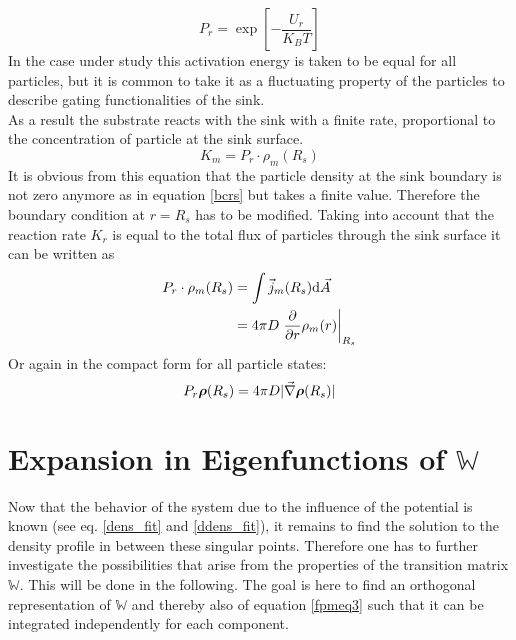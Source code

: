 \begin{equation}
    P_r = \exp\left[- \frac{U_r}{K_B T} \right]
    \label{reaction_arrhenius_factor}
\end{equation}
In the case under study this activation energy is taken to be equal for all particles, but it is common to take it as a fluctuating property of the particles to describe gating functionalities of the sink. \cite{Szabo1982} \\
As a result the substrate reacts with the sink with a finite rate, proportional to the concentration of particle at the sink surface.
\begin{equation}
    K_m = P_r \cdot \rho_m(R_s)
    \label{sink_reaction_rate}
\end{equation}
It is obvious from this equation that the particle density at the sink boundary is not zero anymore as in equation \eqref{bcrs} but takes a finite value. Therefore the boundary condition at $r=R_s$ has to be modified.
Taking into account that the reaction rate $K_r$ is equal to the total flux of particles through the sink surface it can be written as
\begin{align}
    P_r \cdot \rho_m(R_s) &= \int \vec{j}_m(R_s) {\rm d} \vec{A} \nonumber \\
    &= 4 \pi D \left.\frac{\partial}{\partial r} \rho_m(r)\right|_{R_s}
    \label{nbcrs}
\end{align}
Or again in the compact form for all particle states:
\begin{equation}
    P_r \boldsymbol{\mathbf{\rho}}(R_s) = 4 \pi D |\vec{\nabla} \boldsymbol{\mathbf{\rho}}(R_s)|
    \label{nbcrsall}
\end{equation}
\section{Expansion in Eigenfunctions of $\mathbb{W}$}
\label{Expansion_in_Eigenfunctions}
Now that the behavior of the system due to the influence of the potential is known (see eq. \eqref{dens_fit} and \eqref{ddens_fit}), it remains to find the solution to the density profile in between these singular points. Therefore one has to further investigate the possibilities that arise from the properties of the transition matrix $\mathbb{W}$. This will be done in the following. The goal is here to find an orthogonal representation of $\mathbb{W}$ and thereby also of equation \eqref{fpmeq3} such that it can be integrated independently for each component.\\

